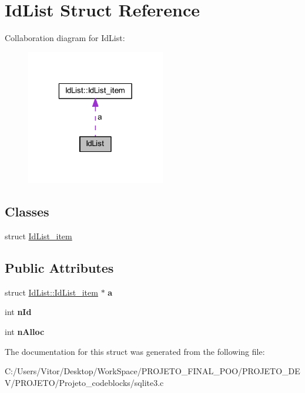 \hypertarget{struct_id_list}{\section{Id\-List Struct Reference}
\label{struct_id_list}
}


Collaboration diagram for Id\-List\-:\nopagebreak
\begin{figure}[H]
\begin{center}
\leavevmode
\includegraphics[width=172pt]{struct_id_list__coll__graph}
\end{center}
\end{figure}
\subsection*{Classes}
\begin{DoxyCompactItemize}
\item 
struct \hyperlink{struct_id_list_1_1_id_list__item}{Id\-List\-\_\-item}
\end{DoxyCompactItemize}
\subsection*{Public Attributes}
\begin{DoxyCompactItemize}
\item 
\hypertarget{struct_id_list_ad33082fd71286c1159711a1a3e979763}{struct \hyperlink{struct_id_list_1_1_id_list__item}{Id\-List\-::\-Id\-List\-\_\-item} $\ast$ {\bfseries a}}\label{struct_id_list_ad33082fd71286c1159711a1a3e979763}

\item 
\hypertarget{struct_id_list_afb785717796d8b3c72d1ae682dcb6ff0}{int {\bfseries n\-Id}}\label{struct_id_list_afb785717796d8b3c72d1ae682dcb6ff0}

\item 
\hypertarget{struct_id_list_ace055dd6237832b141026ea3463c18ae}{int {\bfseries n\-Alloc}}\label{struct_id_list_ace055dd6237832b141026ea3463c18ae}

\end{DoxyCompactItemize}


The documentation for this struct was generated from the following file\-:\begin{DoxyCompactItemize}
\item 
C\-:/\-Users/\-Vitor/\-Desktop/\-Work\-Space/\-P\-R\-O\-J\-E\-T\-O\-\_\-\-F\-I\-N\-A\-L\-\_\-\-P\-O\-O/\-P\-R\-O\-J\-E\-T\-O\-\_\-\-D\-E\-V/\-P\-R\-O\-J\-E\-T\-O/\-Projeto\-\_\-codeblocks/sqlite3.\-c\end{DoxyCompactItemize}

